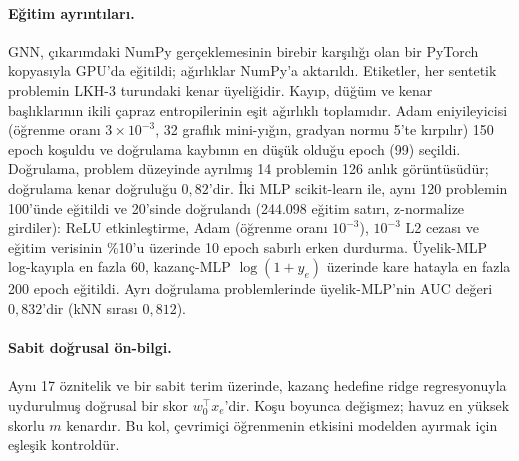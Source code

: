 \paragraph{Eğitim ayrıntıları.} GNN, çıkarımdaki NumPy gerçeklemesinin birebir karşılığı olan bir
PyTorch kopyasıyla GPU'da eğitildi; ağırlıklar NumPy'a aktarıldı. Etiketler, her sentetik problemin
LKH-3 turundaki kenar üyeliğidir. Kayıp, düğüm ve kenar başlıklarının ikili çapraz entropilerinin
eşit ağırlıklı toplamıdır. Adam eniyileyicisi (öğrenme oranı $3\times10^{-3}$, 32 graflık
mini-yığın, gradyan normu 5'te kırpılır) 150 epoch koşuldu ve doğrulama kaybının en düşük olduğu
epoch (99) seçildi. Doğrulama, problem düzeyinde ayrılmış 14 problemin 126 anlık görüntüsüdür;
doğrulama kenar doğruluğu $0{,}82$'dir. İki MLP scikit-learn ile, aynı 120 problemin 100'ünde
eğitildi ve 20'sinde doğrulandı (244.098 eğitim satırı, z-normalize girdiler): ReLU etkinleştirme,
Adam (öğrenme oranı $10^{-3}$), $10^{-3}$ L2 cezası ve eğitim verisinin \%10'u üzerinde 10 epoch
sabırlı erken durdurma. Üyelik-MLP log-kayıpla en fazla 60, kazanç-MLP $\log(1+y_e)$ üzerinde kare
hatayla en fazla 200 epoch eğitildi. Ayrı doğrulama problemlerinde üyelik-MLP'nin AUC değeri
$0{,}832$'dir (kNN sırası $0{,}812$).

\paragraph{Sabit doğrusal ön-bilgi.} Aynı 17 öznitelik ve bir sabit terim üzerinde, kazanç hedefine
ridge regresyonuyla uydurulmuş doğrusal bir skor $w_0^\top x_e$'dir. Koşu boyunca değişmez; havuz en
yüksek skorlu $m$ kenardır. Bu kol, çevrimiçi öğrenmenin etkisini modelden ayırmak için eşleşik
kontroldür.

